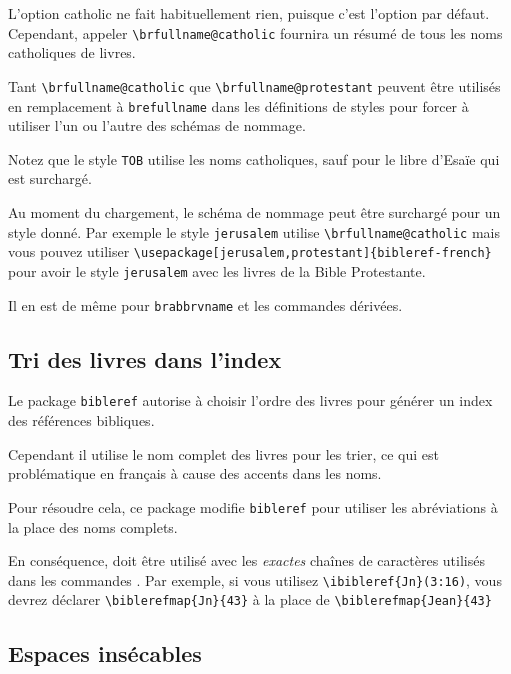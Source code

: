 \documentclass{ltxdoc}
\begin{document}
L'option \textsf{catholic} ne fait habituellement rien, puisque c'est l'option par défaut. Cependant, appeler  \verb!\brfullname@catholic! fournira un résumé de tous les noms catholiques de livres.

Tant \verb|\brfullname@catholic| que \verb|\brfullname@protestant| peuvent être utilisés en remplacement à  \verb|brefullname| dans les définitions de styles pour forcer à utiliser l'un ou l'autre des schémas de nommage.

Notez que le style \verb|TOB| utilise les noms catholiques, sauf pour le libre d'Esaïe qui est surchargé.

Au moment du chargement, le schéma de nommage peut être surchargé pour un style donné. Par exemple le style \verb|jerusalem| utilise \verb|\brfullname@catholic| mais vous pouvez utiliser \verb|\usepackage[jerusalem,protestant]{bibleref-french}| pour avoir le style \verb|jerusalem| avec les livres de la Bible Protestante.

Il en est de même pour \verb|brabbrvname| et les commandes dérivées.

\subsection{Tri des livres dans l'index}

Le package \verb|bibleref| autorise à choisir l'ordre des livres pour générer un index des références bibliques.

Cependant il utilise le nom complet des livres pour les trier, ce qui est problématique en français à cause des accents dans les noms.

Pour résoudre cela, ce package modifie \verb|bibleref| pour utiliser les abréviations à la place des noms complets.
 
En conséquence,  doit être utilisé avec les \emph{exactes} chaînes de caractères utilisés dans les commandes . Par exemple, si vous utilisez \verb|\ibibleref{Jn}(3:16)|, vous devrez déclarer \verb|\biblerefmap{Jn}{43}| à la place de \verb|\biblerefmap{Jean}{43}|

\subsection{Espaces insécables}
\end{document}
